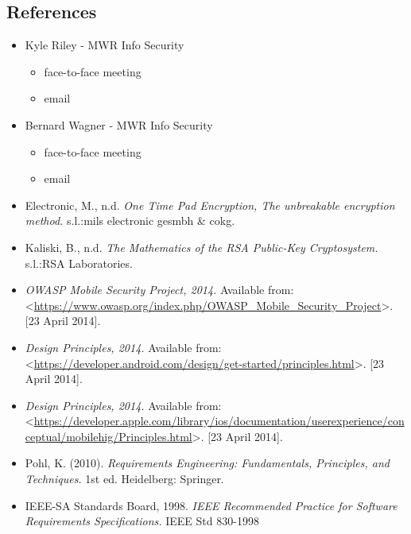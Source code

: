 \subsection{References}
\begin{itemize}
\item{Kyle Riley - MWR Info Security}
	\begin{itemize}
	\item face-to-face meeting
	\item email
	\end{itemize}

\item{Bernard Wagner - MWR Info Security}
	\begin{itemize}
	\item face-to-face meeting
	\item email
	\end{itemize}

\item{Electronic, M., n.d. \textit{One Time Pad Encryption, The unbreakable encryption method.} s.l.:mils electronic gesmbh \& cokg.}

\item{Kaliski, B., n.d. \textit{The Mathematics of the RSA Public-Key Cryptosystem.} s.l.:RSA Laboratories.}

\item{\textit{OWASP Mobile Security Project, 2014.} Available from: \textless\url{https://www.owasp.org/index.php/OWASP_Mobile_Security_Project}\textgreater. [23 April 2014].}

\item{\textit{Design Principles, 2014.} Available from:  \textless\url{https://developer.android.com/design/get-started/principles.html}\textgreater. [23 April 2014].}

\item{\textit{Design Principles, 2014.} Available from: \textless\url{https://developer.apple.com/library/ios/documentation/userexperience/conceptual/mobilehig/Principles.html}\textgreater. [23 April 2014].}

\item{Pohl, K. (2010). \textit{Requirements Engineering: Fundamentals, Principles, and Techniques.} 1st ed. Heidelberg: Springer.}

\item{IEEE-SA Standards Board, 1998. \textit{IEEE Recommended Practice for Software Requirements Specifications.} IEEE Std 830-1998}

\end{itemize}

